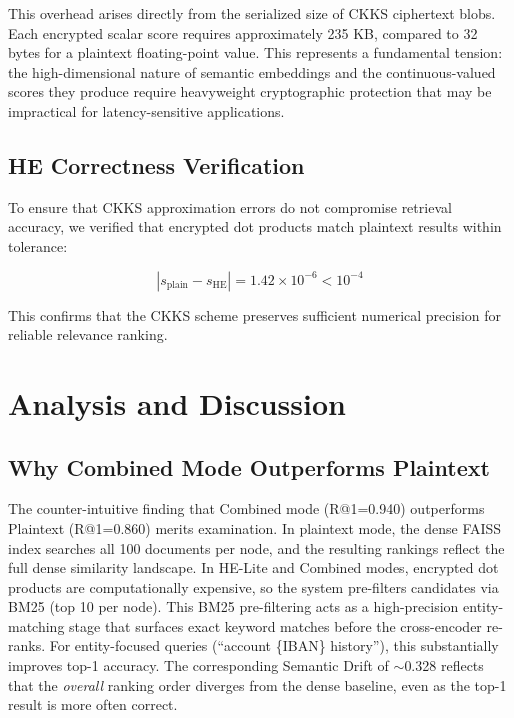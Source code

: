 \documentclass[conference]{IEEEtran}
\begin{document}
This overhead arises directly from the serialized size of CKKS ciphertext blobs. Each encrypted scalar score requires approximately 235 KB, compared to 32 bytes for a plaintext floating-point value. This represents a fundamental tension: the high-dimensional nature of semantic embeddings and the continuous-valued scores they produce require heavyweight cryptographic protection that may be impractical for latency-sensitive applications.

\subsection{HE Correctness Verification}

To ensure that CKKS approximation errors do not compromise retrieval accuracy, we verified that encrypted dot products match plaintext results within tolerance:

\begin{equation}
    |s_{\text{plain}} - s_{\text{HE}}| = 1.42 \times 10^{-6} < 10^{-4}
\end{equation}

This confirms that the CKKS scheme preserves sufficient numerical precision for reliable relevance ranking.

\section{Analysis and Discussion}
\label{sec:analysis}

\subsection{Why Combined Mode Outperforms Plaintext}

The counter-intuitive finding that Combined mode (R@1=0.940) outperforms Plaintext (R@1=0.860) merits examination. In plaintext mode, the dense FAISS index searches all 100 documents per node, and the resulting rankings reflect the full dense similarity landscape. In HE-Lite and Combined modes, encrypted dot products are computationally expensive, so the system pre-filters candidates via BM25 (top 10 per node). This BM25 pre-filtering acts as a high-precision entity-matching stage that surfaces exact keyword matches before the cross-encoder re-ranks. For entity-focused queries (``account \{IBAN\} history''), this substantially improves top-1 accuracy. The corresponding Semantic Drift of $\sim$0.328 reflects that the \textit{overall} ranking order diverges from the dense baseline, even as the top-1 result is more often correct.
\end{document}
